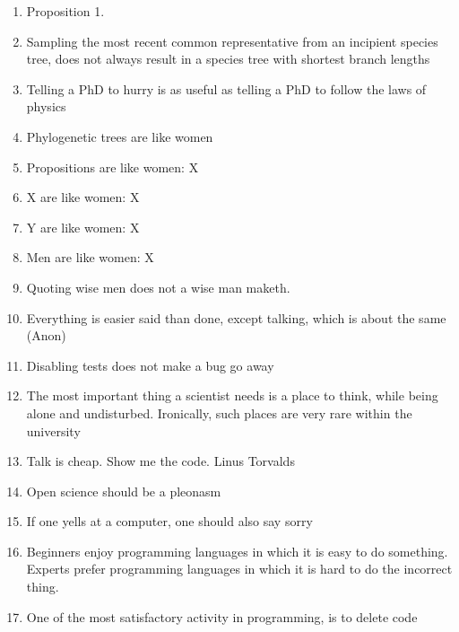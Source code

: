 \documentclass{dissertation}
\begin{document}
\begin{enumerate}

\item Proposition 1.
\item Sampling the most recent common representative from an incipient
  species tree, does not always result in a species tree with shortest
  branch lengths
\item Telling a PhD to hurry is as useful as telling a PhD to follow the laws of physics
\item Phylogenetic trees are like women
\item Propositions are like women: X
\item X are like women: X
\item Y are like women: X
\item Men are like women: X
\item Quoting wise men does not a wise man maketh.
\item Everything is easier said than done, except talking, which is about the same (Anon)
\item Disabling tests does not make a bug go away
\item The most important thing a scientist needs is a place to think, while
      being alone and undisturbed. Ironically, such places are very rare
      within the university
\item Talk is cheap. Show me the code. Linus Torvalds
\item Open science should be a pleonasm
\item If one yells at a computer, one should also say sorry
\item Beginners enjoy programming languages in which it is easy to do something.
      Experts prefer programming languages in which it is hard to do the incorrect thing.
\item One of the most satisfactory activity in programming, is to delete code
\end{enumerate}
\end{document}
